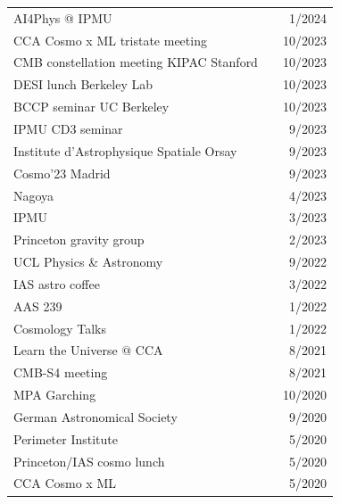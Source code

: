 \begin{longtable}{lcr}
AI4Phys @ IPMU && 1/2024 \\
CCA Cosmo x ML tristate meeting && 10/2023 \\
CMB constellation meeting KIPAC Stanford && 10/2023 \\
DESI lunch Berkeley Lab && 10/2023 \\
BCCP seminar UC Berkeley && 10/2023 \\
IPMU CD3 seminar && 9/2023 \\
Institute d'Astrophysique Spatiale Orsay && 9/2023 \\
Cosmo'23 Madrid && 9/2023 \\
Nagoya && 4/2023 \\
IPMU && 3/2023 \\
Princeton gravity group && 2/2023 \\
UCL Physics \& Astronomy && 9/2022 \\
IAS astro coffee && 3/2022 \\
AAS 239 && 1/2022 \\
Cosmology Talks && 1/2022 \\
Learn the Universe @ CCA && 8/2021 \\
CMB-S4 meeting && 8/2021 \\
MPA Garching && 10/2020 \\
German Astronomical Society && 9/2020 \\
Perimeter Institute && 5/2020 \\
Princeton/IAS cosmo lunch && 5/2020 \\
CCA Cosmo x ML && 5/2020 \\
\end{longtable}
